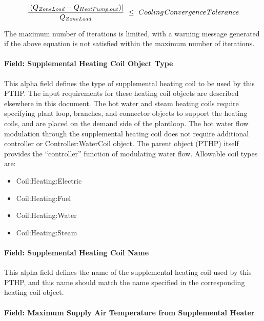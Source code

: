 \begin{equation}
\frac{{\left| {({Q_{ZoneLoad}} - {Q_{HeatPump,out}})} \right|}}{{{Q_{ZoneLoad}}}}\,\, \le \,\,Cooling{\kern 1pt} Convergence{\kern 1pt} Tolerance
\end{equation}

The maximum number of iterations is limited, with a warning message generated if the above equation is not satisfied within the maximum number of iterations.

\paragraph{Field: Supplemental Heating Coil Object Type}\label{field-supplemental-heating-coil-object-type-000}

This alpha field defines the type of supplemental heating coil to be used by this PTHP. The input requirements for these heating coil objects are described elsewhere in this document. The hot water and steam heating coils require specifying plant loop, branches, and connector objects to support the heating coils, and are placed on the demand side of the plantloop. The hot water flow modulation through the supplemental heating coil does not require additional controller or Controller:WaterCoil object. The parent object (PTHP) itself provides the ``controller'' function of modulating water flow. Allowable coil types are:

\begin{itemize}
\item
  Coil:Heating:Electric
\item
  Coil:Heating:Fuel
\item
  Coil:Heating:Water
\item
  Coil:Heating:Steam
\end{itemize}

\paragraph{Field: Supplemental Heating Coil Name}\label{field-supplemental-heating-coil-name-000}

This alpha field defines the name of the supplemental heating coil used by this PTHP, and this name should match the name specified in the corresponding heating coil object.

\paragraph{Field: Maximum Supply Air Temperature from Supplemental Heater}\label{field-maximum-supply-air-temperature-from-supplemental-heater-000}

